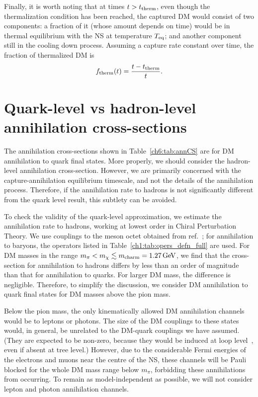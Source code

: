 Finally, it is worth noting that at times  $t>t_{\rm therm}$, even though the thermalization condition has been reached, the captured DM would consist of two components: a fraction of it (whose amount depends on time) would be in thermal equilibrium with the NS at temperature $T_{\rm eq}$; and another component still in the cooling down process. Assuming a  capture rate constant over time, the fraction of thermalized DM is 
\begin{equation}
    f_{\rm therm}(t) = \frac{t-t_{\rm therm}}{t}.
\end{equation}




\section{Quark-level vs hadron-level annihilation cross-sections}
\label{sec:quarkhadron}

The annihilation cross-sections shown in Table~\ref{ch6:tab:annCS} are for DM annihilation to quark final states.  More properly, we should consider the hadron-level annihilation cross-section.
However, we are primarily concerned with the capture-annihilation equilibrium timescale, and not the details of the annihilation process. Therefore, if the annihilation rate to hadrons is not significantly different from the quark level result, this subtlety can be avoided. 

To check the validity of the quark-level approximation, we estimate the annihilation rate to hadrons, working at lowest order in Chiral Perturbation Theory. We use couplings to the meson octet obtained from  ref.~\cite{Kumar:2018heq_dec_IndirectDetectionSubGeV}; for annihilation to baryons, the operators listed in Table~\ref{ch1:tab:opers_defn_full} are used. 
For DM masses in the range $m_\pi < m_\chi \lesssim m_{\rm charm} = 1.27{\rm \,GeV}$, we find that the cross-section for annihilation to hadrons differs by less than an order of magnitude than that for annihilation to quarks. For larger DM mass, the difference is negligible. Therefore, to simplify the discussion, we consider DM annihilation to quark final states for DM masses above the pion mass.


Below the pion mass, the only kinematically allowed DM annihilation channels would be to leptons or photons. The size of the DM couplings to these states would, in general, be unrelated to the DM-quark couplings we have assumed. (They are expected to be non-zero, because they would be induced at loop level~\cite{Bell:2019pyc_jun_CaptureLeptophilicDark}, even if absent at tree level.)
However, due to the considerable Fermi energies of the electrons and muons near the centre of the NS, these channels will be Pauli blocked for the whole DM mass range below $m_\pi$, forbidding these annihilations from occurring. To remain as model-independent as possible, we will not consider lepton and photon annihilation channels.

